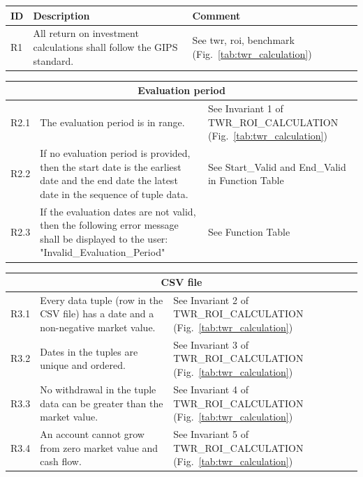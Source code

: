 \documentclass[runningheads,12pt]{article}
\begin{document}
{\centering
\begin{longtable}{|l|p{9cm}|p{5cm}|}
\hline
\textbf{ID} & \textbf{Description} & \textbf{Comment}\\

\hline
R1 & All return on investment calculations shall follow the GIPS standard. & See twr, roi, benchmark (Fig.~\ref{tab:twr_calculation}) \\

\hline
\end{longtable}
\centering
\begin{longtable}{|l|p{9cm}|p{5cm}|}
\hline
\multicolumn{3}{|c|}{\textbf{Evaluation period}} \\

\hline
R2.1 & The evaluation period is in range. & See Invariant 1 of TWR\_ROI\_CALCULATION (Fig.~\ref{tab:twr_calculation})\\

\hline
R2.2 & If no evaluation period is provided, then the start date is the earliest date and the end date the latest date in the sequence of tuple data. & See Start\_Valid and End\_Valid in Function Table\\

\hline
R2.3 & If the evaluation dates are not valid, then the following error message shall be displayed to the user: "Invalid\_Evaluation\_Period" & See Function Table \\

\hline
\end{longtable}
\centering
\begin{longtable}{|l|p{9cm}|p{5cm}|}

\hline
\multicolumn{3}{|c|}{\textbf{CSV file}} \\

\hline
R3.1 & Every data tuple (row in the CSV file) has a date and a non-negative market value. & See Invariant 2 of TWR\_ROI\_CALCULATION (Fig.~\ref{tab:twr_calculation})\\

\hline
R3.2 &  Dates in the tuples are unique and ordered. & See Invariant 3 of TWR\_ROI\_CALCULATION (Fig.~\ref{tab:twr_calculation})\\

\hline
R3.3 & No withdrawal in the tuple data can be greater than the market value. & See Invariant 4 of TWR\_ROI\_CALCULATION (Fig.~\ref{tab:twr_calculation})\\

\hline
R3.4 & An account cannot grow from zero market value and cash flow. & See Invariant 5 of TWR\_ROI\_CALCULATION (Fig.~\ref{tab:twr_calculation})\\


\end{longtable}}
\end{document}
